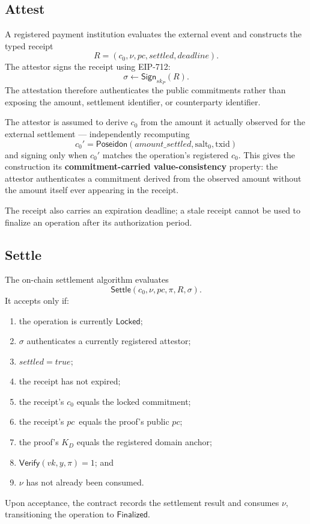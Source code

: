 \documentclass[10pt,twocolumn]{article}
\newcommand{\Poseidon}{\ensuremath{\mathsf{Poseidon}}}
\newcommand{\txid}{\ensuremath{\text{txid}}}
\newcommand{\salt}{\ensuremath{\text{salt}}}
\newcommand{\pc}{\ensuremath{\mathit{pc}}}
\newcommand{\Verify}{\ensuremath{\mathsf{Verify}}}
\newcommand{\Settle}{\ensuremath{\mathsf{Settle}}}
\newcommand{\Locked}{\ensuremath{\mathsf{Locked}}}
\newcommand{\Finalized}{\ensuremath{\mathsf{Finalized}}}
\begin{document}
\subsection{Attest}
\label{sec:attest}

A registered payment institution evaluates the external event and
constructs the typed receipt
\[
R = (c_0,\nu,\pc,\mathit{settled},\mathit{deadline}).
\]
The attestor signs the receipt using EIP-712:
\[
\sigma \leftarrow \mathsf{Sign}_{sk_P}(R).
\]
The attestation therefore authenticates the public commitments rather
than exposing the amount, settlement identifier, or counterparty
identifier.

The attestor is assumed to derive $c_0$ from the amount it actually
observed for the external settlement --- independently recomputing
\[
c_0' = \Poseidon(\mathit{amount\_settled},\salt_0,\txid)
\]
and signing only when $c_0'$ matches the operation's registered $c_0$.
This gives the construction its \textbf{commitment-carried
value-consistency} property: the attestor authenticates a commitment
derived from the observed amount without the amount itself ever
appearing in the receipt.

The receipt also carries an expiration deadline; a stale receipt cannot
be used to finalize an operation after its authorization period.

\subsection{Settle}
\label{sec:settle}

The on-chain settlement algorithm evaluates
\[
\Settle(c_0,\nu,\pc,\pi,R,\sigma).
\]
It accepts only if:
\begin{enumerate}
\item the operation is currently \Locked;
\item $\sigma$ authenticates a currently registered attestor;
\item $\mathit{settled}=\mathit{true}$;
\item the receipt has not expired;
\item the receipt's $c_0$ equals the locked commitment;
\item the receipt's \pc\ equals the proof's public \pc;
\item the proof's $K_D$ equals the registered domain anchor;
\item $\Verify(vk,y,\pi)=1$; and
\item $\nu$ has not already been consumed.
\end{enumerate}
Upon acceptance, the contract records the settlement result and consumes
$\nu$, transitioning the operation to \Finalized.
\end{document}
